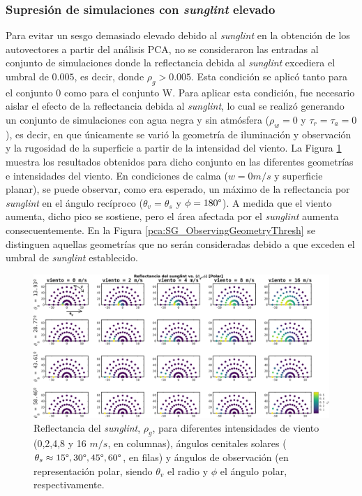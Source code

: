         \subsubsection{Supresión de simulaciones con \textit{sunglint} elevado}
        \label{pca:s:sunglint}
            
            Para evitar un sesgo demasiado elevado debido al \textit{sunglint} en la obtención de los autovectores a partir del análisis PCA, no se consideraron las entradas al conjunto de simulaciones donde la reflectancia debida al \textit{sunglint} excediera el umbral de $0.005$, es decir, donde $\rho_{g}>0.005$. Esta condición se aplicó tanto para el conjunto 0 como para el conjunto W. Para aplicar esta condición, fue necesario aislar el efecto de la reflectancia debida al \textit{sunglint}, lo cual se realizó generando un conjunto de simulaciones con agua negra y sin atmósfera ($\rho_{w}=0$ y $\tau_{r}=\tau_{a}=0$), es decir, en que únicamente se varió la geometría de iluminación y observación y la rugosidad de la superficie a partir de la intensidad del viento. La Figura \ref{pca:SG_ObservingGeometry} muestra los resultados obtenidos para dicho conjunto en las diferentes geometrías e intensidades del viento. En condiciones de calma ($w = 0 m/s$ y superficie planar), se puede observar, como era esperado, un máximo de la reflectancia por \textit{sunglint} en el ángulo recíproco ($\theta_{v} = \theta_{s}$ y $\phi = 180 \degree$). A medida que el viento aumenta, dicho pico se sostiene, pero el área afectada por el \textit{sunglint} aumenta consecuentemente. En la Figura \ref{pca:SG_ObservingGeometryThresh} se distinguen aquellas geometrías que no serán consideradas debido a que exceden el umbral de \textit{sunglint} establecido.
            
            \begin{figure}
            \centering
            \includegraphics[width=\textwidth]{pca/figures/SG_ObservingGeometry.png}
            \caption[Reflectancia del \textit{sunglint} para diferentes intensidades de viento, ángulos cenitales solares y ángulos de observación.]{Reflectancia del \textit{sunglint}, $\rho_{g}$, para diferentes intensidades de viento (0,2,4,8 y 16 $m/s$, en columnas), ángulos cenitales solares ($\theta_{s} \approx 15\degree, 30\degree, 45\degree, 60\degree$, en filas) y ángulos de observación (en representación polar, siendo $\theta_{v}$ el radio y $\phi$ el ángulo polar, respectivamente.}
            \label{pca:SG_ObservingGeometry}
            \end{figure}
    
